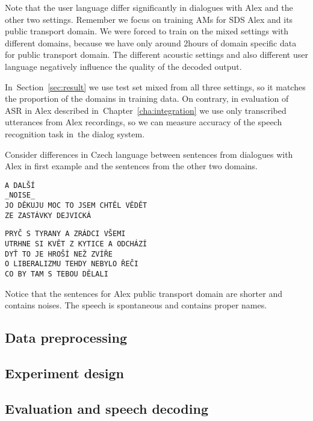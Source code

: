Note that the user language differ significantly in dialogues with Alex and the other two settings.
Remember we focus on training \acp{AM} for \ac{SDS} Alex and its public transport domain.
We were forced to train on the mixed settings with different domains, because
we have only around 2hours of domain specific data for public transport domain.
The different acoustic settings and also different user language negatively influence
the quality of the decoded output.

In~Section~\ref{sec:result} we use test set mixed from all three settings,
so it matches the proportion of the domains in training data.
On contrary, in evaluation of \ac{ASR} in Alex described in~Chapter~\ref{cha:integration}
we use only transcribed utterances from Alex recordings, 
so we can measure accuracy of the speech recognition task in~the dialog system.

Consider differences in Czech language between sentences from dialogues with Alex 
in first example and the sentences from the other two domains.
\begin{verbatim}
A DALŠÍ
_NOISE_
JO DĚKUJU MOC TO JSEM CHTĚL VĚDĚT
ZE ZASTÁVKY DEJVICKÁ
\end{verbatim}

\begin{verbatim}
PRYČ S TYRANY A ZRÁDCI VŠEMI
UTRHNE SI KVĚT Z KYTICE A ODCHÁZÍ
DYŤ TO JE HROŠÍ NEŽ ZVÍŘE
O LIBERALIZMU TEHDY NEBYLO ŘEČI
CO BY TAM S TEBOU DĚLALI
\end{verbatim}

Notice that the sentences for Alex public transport domain are shorter
and contains noises. The speech is spontaneous and contains proper names.

\subsection{Data preprocessing}
\label{sub:preproces}



\subsection{Experiment design}
\label{sub:experiment_design}

\subsection{Evaluation and speech decoding}
\label{sub:evaluation_and_speech_decoding}




